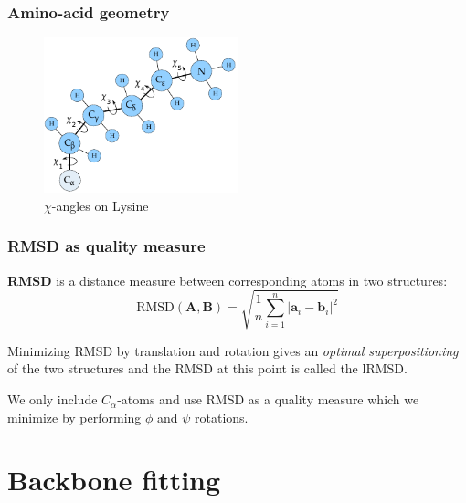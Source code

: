 \documentclass{beamer}
\renewcommand\v[1]{\boldsymbol{#1}}
\begin{document}
\begin{frame}[t, fragile]
  \frametitle{Amino-acid geometry}
  \vspace{0.5cm}
  \begin{figure}
    \centering
    \includegraphics[width=0.5\textwidth]{../rapport/figures/lysine.pdf}
    \caption{$\chi$-angles on Lysine}
    \label{fig:front}
  \end{figure}
\end{frame}

\begin{frame}[t, fragile]
  \frametitle{RMSD as quality measure}
  
  \textbf{RMSD} is a distance measure between corresponding atoms in two structures:
\begin{displaymath}
  \label{eq:rmsd}
  \text{RMSD}(\v{A}, \v{B}) = \sqrt{\frac{1}{n}\sum_{i=1}^n |\v{a}_i - \v{b}_i|^2}
\end{displaymath}

Minimizing RMSD by translation and rotation gives an \textit{optimal
  superpositioning} of the two structures and the RMSD at this point
is called the lRMSD.\\\vspace{0.5cm}

We only include $C_\alpha$-atoms and use RMSD as a quality measure
which we minimize by performing $\phi$ and $\psi$ rotations.

  
\end{frame}

\section{Backbone fitting}
\end{document}
